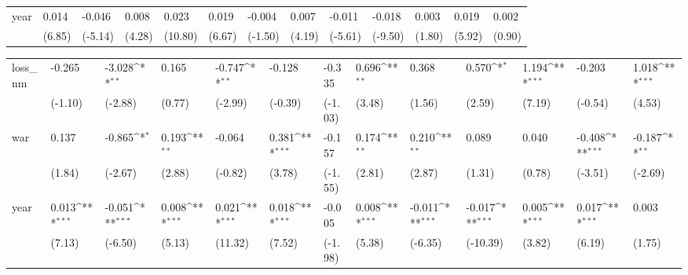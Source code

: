\begin{tabular}{p{1.5cm} p{1.7cm} p{1.7cm} p{1.7cm} p{1.7cm} p{1.7cm} p{1.7cm} p{1.7cm} p{1.7cm} p{1.7cm} p{1.7cm} p{1.7cm} p{1.7cm}}
year            &    0.014\sym{***}&   -0.046\sym{***}&    0.008\sym{***}&    0.023\sym{***}&    0.019\sym{***}&   -0.004         &    0.007\sym{***}&   -0.011\sym{***}&   -0.018\sym{***}&    0.003         &    0.019\sym{***}&    0.002         \\
                &   (6.85)         &  (-5.14)         &   (4.28)         &  (10.80)         &   (6.67)         &  (-1.50)         &   (4.19)         &  (-5.61)         &  (-9.50)         &   (1.80)         &   (5.92)         &   (0.90)         \\
\end{tabular}
\def\sym#1{\ifmmode^{#1}\else\(^{#1}\)\fi}
\begin{tabular}{p{1.5cm} p{1.7cm} p{1.7cm} p{1.7cm} p{1.7cm} p{1.7cm} p{1.7cm} p{1.7cm} p{1.7cm} p{1.7cm} p{1.7cm} p{1.7cm} p{1.7cm}}
\hline
loss\_nm         &   -0.265         &   -3.028\sym{**} &    0.165         &   -0.747\sym{**} &   -0.128         &   -0.335         &    0.696\sym{**} &    0.368         &    0.570\sym{*}  &    1.194\sym{***}&   -0.203         &    1.018\sym{***}\\
                &  (-1.10)         &  (-2.88)         &   (0.77)         &  (-2.99)         &  (-0.39)         &  (-1.03)         &   (3.48)         &   (1.56)         &   (2.59)         &   (7.19)         &  (-0.54)         &   (4.53)         \\
war             &    0.137         &   -0.865\sym{*}  &    0.193\sym{**} &   -0.064         &    0.381\sym{***}&   -0.157         &    0.174\sym{**} &    0.210\sym{**} &    0.089         &    0.040         &   -0.408\sym{***}&   -0.187\sym{**} \\
                &   (1.84)         &  (-2.67)         &   (2.88)         &  (-0.82)         &   (3.78)         &  (-1.55)         &   (2.81)         &   (2.87)         &   (1.31)         &   (0.78)         &  (-3.51)         &  (-2.69)         \\
year            &    0.013\sym{***}&   -0.051\sym{***}&    0.008\sym{***}&    0.021\sym{***}&    0.018\sym{***}&   -0.005         &    0.008\sym{***}&   -0.011\sym{***}&   -0.017\sym{***}&    0.005\sym{***}&    0.017\sym{***}&    0.003         \\
                &   (7.13)         &  (-6.50)         &   (5.13)         &  (11.32)         &   (7.52)         &  (-1.98)         &   (5.38)         &  (-6.35)         & (-10.39)         &   (3.82)         &   (6.19)         &   (1.75)         \\
\end{tabular}

